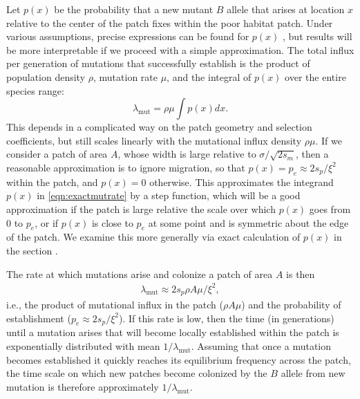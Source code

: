 \documentclass[10pt,letterpaper]{article}
\newcommand{\citep}[1]{\cite{#1}}
\newcommand{\mutrate}{\lambda_\text{mut}}
\newcommand{\secref}[1]{{\emph{\nameref{#1}}}}
\begin{document}
Let $p(x)$ be the probability that a new mutant $B$ allele that arises at location $x$
relative to the center of the patch fixes within the poor habitat patch.
Under various assumptions, precise expressions can be found for $p(x)$ \citep{barton1987establishment},
but results will be more interpretable if we proceed with a simple approximation.
The total influx per generation of mutations that successfully establish is 
the product of population density $\rho$, mutation rate $\mu$, and the
integral of $p(x)$ over the entire species range:
\begin{equation}
  \mutrate = \rho \mu \int p(x) dx \label{eqn:exactmutrate} .
\end{equation}
This depends in a complicated way on the patch geometry and selection coefficients,
but still scales linearly with the mutational influx density $\rho \mu$.
If we consider a patch of area $A$, whose width is large relative to $\sigma/\sqrt{2s_m}$, 
then a reasonable approximation is to ignore migration, 
so that $p(x) = p_e \approx 2 s_p / \xi^2$ within the patch, and $p(x) = 0$ otherwise.
This approximates the integrand $p(x)$ in \eqref{eqn:exactmutrate} by a step function,
which will be a good approximation if the patch is large relative the scale over which $p(x)$ goes from 0 to $p_e$,
or if $p(x)$ is close to $p_e$ at some point and is symmetric about the edge of the patch. 
We examine this more generally via exact calculation of $p(x)$ in the section \secref{apx:establishment_sims}.

The rate at which mutations arise and colonize a patch of area $A$ is then
\begin{align} \label{eqn:mutrate} 
  \mutrate %
  \approx 2 s_p \rho A \mu / \xi^2,  
\end{align}
i.e., the product of mutational influx in the patch ($\rho A\mu$) and the probability of establishment ($p_e \approx 2s_p/\xi^2$).
If this rate is low, then the time (in generations) until a mutation arises that
will become locally established within the patch is exponentially distributed with mean $1/\mutrate$.  
Assuming that once a mutation becomes established it quickly reaches its equilibrium frequency across the patch, 
the time scale on which new patches become colonized by the $B$ allele from new mutation is therefore approximately $1/\mutrate$.
\end{document}
